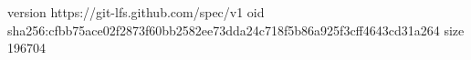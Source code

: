 version https://git-lfs.github.com/spec/v1
oid sha256:cfbb75ace02f2873f60bb2582ee73dda24c718f5b86a925f3cff4643cd31a264
size 196704
